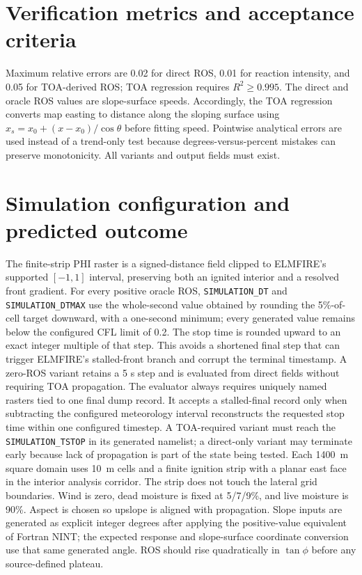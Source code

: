 \section{Verification metrics and acceptance criteria}
Maximum relative errors are 0.02 for direct ROS, 0.01 for reaction intensity, and 0.05 for TOA-derived ROS; TOA regression requires $R^2\ge0.995$. The direct and oracle ROS values are slope-surface speeds. Accordingly, the TOA regression converts map easting to distance along the sloping surface using $x_s=x_0+(x-x_0)/\cos\theta$ before fitting speed. Pointwise analytical errors are used instead of a trend-only test because degrees-versus-percent mistakes can preserve monotonicity.  All variants and output fields must exist.

\section{Simulation configuration and predicted outcome}

The finite-strip PHI raster is a signed-distance field clipped to ELMFIRE's supported $[-1,1]$ interval, preserving both an ignited interior and a resolved front gradient. For every positive oracle ROS, \texttt{SIMULATION\_DT} and \texttt{SIMULATION\_DTMAX} use the whole-second value obtained by rounding the 5\%-of-cell target downward, with a one-second minimum; every generated value remains below the configured CFL limit of 0.2. The stop time is rounded upward to an exact integer multiple of that step. This avoids a shortened final step that can trigger ELMFIRE's stalled-front branch and corrupt the terminal timestamp. A zero-ROS variant retains a 5 s step and is evaluated from direct fields without requiring TOA propagation. The evaluator always requires uniquely named rasters tied to one final dump record. It accepts a stalled-final record only when subtracting the configured meteorology interval reconstructs the requested stop time within one configured timestep. A TOA-required variant must reach the \texttt{SIMULATION\_TSTOP} in its generated namelist; a direct-only variant may terminate early because lack of propagation is part of the state being tested.
Each \SI{1400}{m} square domain uses \SI{10}{m} cells and a finite ignition strip with a planar east face in the interior analysis corridor.  The strip does not touch the lateral grid boundaries.  Wind is zero, dead moisture is fixed at 5/7/9\%, and live moisture is 90\%.  Aspect is chosen so upslope is aligned with propagation.  Slope inputs are generated as explicit integer degrees after applying the positive-value equivalent of Fortran NINT; the expected response and slope-surface coordinate conversion use that same generated angle.  ROS should rise quadratically in $\tan\phi$ before any source-defined plateau.

